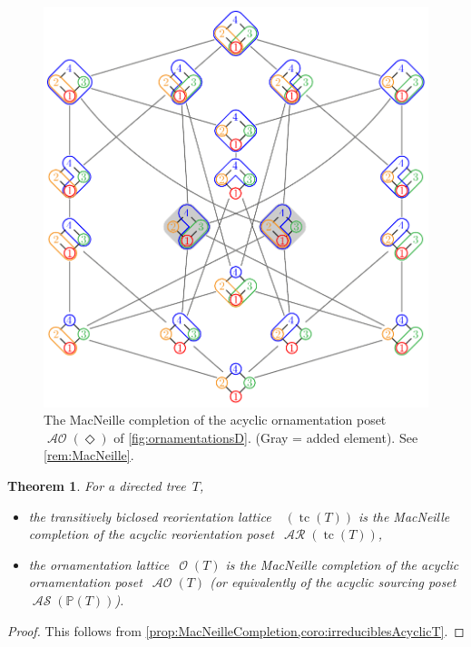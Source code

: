 \documentclass{amsart}
\newtheorem{theorem}{Theorem}[section]
\theoremstyle{definition}
\renewcommand{\c}[1]{\mathcal{#1}} %
\DeclareMathOperator{\tc}{tc} %
\DeclareMathOperator{\Orn}{\c{O}}  %
\DeclareMathOperator{\AOrn}{\c{AO}}  %
\DeclareMathOperator{\AReori}{\c{AR}}  %
\DeclareMathOperator{\Rbi}{\c{R}^{bi}}  %
\DeclareMathOperator{\ASour}{\mathcal{AS}}  %
\newcommand{\PP}{\mathbb P} %
\newcommand{\Dgraph}{\boldsymbol{\Diamond}} %
\begin{document}
\begin{figure}
	\centerline{\includegraphics[scale=.68]{MacNeilleAcyclicOrnamentationsD}}
	\caption{The MacNeille completion of the acyclic ornamentation poset~$\AOrn(\Dgraph)$ of \cref{fig:ornamentationsD}. (Gray = added element). See \cref{rem:MacNeille}.}
	\label{fig:MacNeilleAcyclicOrnamentationsD}
\end{figure}

\begin{theorem}
\label{thm:MacNeille}
For a directed tree~$T$, 
\begin{itemize}
\item the transitively biclosed reorientation lattice~$\Rbi(\tc(T))$ is the MacNeille completion of the acyclic reorientation poset~$\AReori(\tc(T))$,
\item the ornamentation lattice~$\Orn(T)$ is the MacNeille completion of the acyclic ornamentation poset~$\AOrn(T)$ (or equivalently of the acyclic sourcing poset~$\ASour(\PP(T))$).
\end{itemize}
\end{theorem}

\begin{proof}
This follows from \cref{prop:MacNeilleCompletion,coro:irreduciblesAcyclicT}.
\end{proof}
\end{document}
